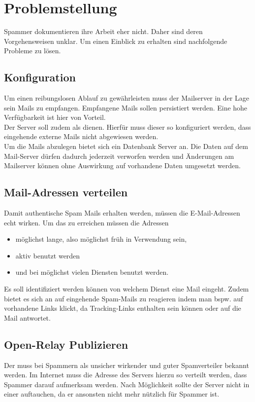 \documentclass[a4paper,11pt,singlespacing]{article}
\begin{document}
\newpage


\section{Problemstellung}\label{sec:Problemstellung}
	Spammer dokumentieren ihre Arbeit eher nicht.
	Daher sind deren Vorgehensweisen unklar.
	Um einen Einblick zu erhalten sind nachfolgende Probleme zu lösen.

	\subsection{Konfiguration}\label{sec:ProblemstellungKonfiguration}
		Um einen reibungslosen Ablauf zu gewährleisten muss der Mailserver in der Lage sein Mails zu empfangen.
		Empfangene Mails sollen persistiert werden.
		Eine hohe Verfügbarkeit ist hier von Vorteil.
		\\
		Der Server soll zudem als  dienen.
		Hierfür muss dieser so konfiguriert werden, dass eingehende externe Mails nicht abgewiesen werden.
		\\
		Um die Mails abzulegen bietet sich ein Datenbank Server an.
		Die Daten auf dem Mail-Server dürfen dadurch jederzeit verworfen werden und Änderungen am Mailserver können ohne Auswirkung auf vorhandene Daten umgesetzt werden.

	\subsection{Mail-Adressen verteilen}\label{sec:ProblemstellungMailsVerteilen}
		Damit authentische Spam Mails erhalten werden, müssen die E-Mail-Adressen echt wirken.
		Um das zu erreichen müssen die Adressen
		\begin{itemize}
		\item möglichst lange, also möglichst früh in Verwendung sein,
		\item aktiv benutzt werden
		\item und bei möglichst vielen Diensten benutzt werden.
		\end{itemize}
		Es soll identifiziert werden können von welchem Dienst eine Mail eingeht.
		Zudem bietet es sich an auf eingehende Spam-Mails zu reagieren indem man bspw. auf vorhandene Links klickt, da Tracking-Links enthalten sein können oder auf die Mail antwortet. %

	\subsection{Open-Relay Publizieren}\label{sec:ProblemstellungPublizieren}
		Der  muss bei Spammern als unsicher wirkender  und guter Spamverteiler bekannt werden.
		Im Internet muss die Adresse des Servers hierzu so verteilt werden, dass Spammer darauf aufmerksam werden.
		Nach Möglichkeit sollte der Server nicht in einer   auftauchen, da er ansonsten nicht mehr nützlich für Spammer ist.
\end{document}
